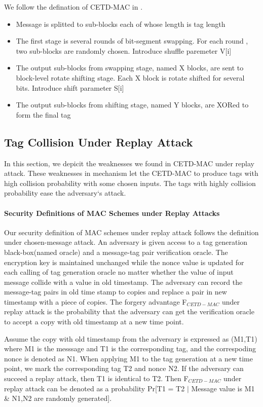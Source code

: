 \documentclass{article}
\begin{document}
We follow the defination of CETD-MAC in \cite{keylist}. 
\begin{itemize}
	\item Message is splitted to sub-blocks each of whose length is tag length
	\item The first stage is several rounds of bit-segment swapping. For each round , two sub-blocks are randomly chosen. Introduce shuffle paremeter V[i]
	\item The output sub-blocks from swapping stage, named X blocks, are sent to block-level rotate shifting stage. Each X block is rotate shifted for several bits. Introduce shift parameter S[i]
	\item The output sub-blocks from shifting stage, named Y blocks, are XORed to form the final tag
\end{itemize}


\subsection{Tag Collision Under Replay Attack}
In this section, we depicit the weaknesses we found in CETD-MAC under replay attack. These weaknesses in mechanism let the CETD-MAC to produce tags with high collision probability with some chosen inputs. The tags with highly collision probability ease the adversary`s attack.
\paragraph{Security Definitions of MAC Schemes under Replay Attacks}
Our security definition of MAC schemes under replay attack follows the definition under chosen-message attack. 
An adversary is given  access to a tag generation black-box(named oracle) and a message-tag pair verification oracle. The encryption key is maintained unchanged while the nonce value is updated for each calling of tag generation oracle no matter whether the value of input message collide with a value in old timestamp. The adversary can record the message-tag pairs in old time stamp to copies and replace a pair in new timestamp with a piece of copies. The forgery advantage F$_{CETD-MAC}$ under replay attack is the probability that the adversary can get the verification oracle to accept a copy with old timestamp at a new time point. 

Assume the copy with old timestamp from the adversary is expressed as (M1,T1) where M1 is the messsage and T1 is the corresponding tag, and the correspoding nonce is denoted as N1. When applying M1 to the tag generation at a new time point, we mark the corresponding tag T2 and nonce N2. If the adversary can succeed a replay attack, then T1 is identical to T2.
Then F$_{CETD-MAC}$ under replay attack can be denoted as a probability Pr[T1 = T2  $\mid$ Message value is M1 \& N1,N2 are randomly generated]. 
\end{document}
